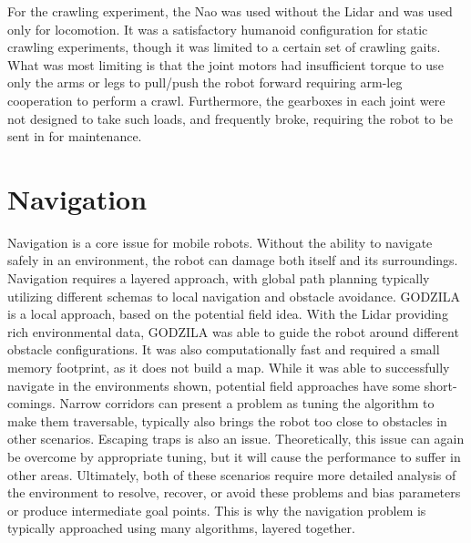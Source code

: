 For the crawling experiment, the Nao was used without the Lidar and was used 
only for locomotion. It was a satisfactory humanoid configuration for static
crawling experiments, though it was limited to a certain set of crawling
gaits. What was most limiting is that the joint motors had insufficient
torque to use only the arms or legs to pull/push the robot forward requiring
arm-leg cooperation to perform a crawl. Furthermore, the gearboxes in each
joint were not designed to take such loads, and frequently broke, requiring
the robot to be sent in for maintenance.

\section{Navigation}
Navigation is a core issue for mobile robots. Without the ability to navigate
safely in an environment, the robot can damage both itself and its surroundings.
Navigation requires a layered approach, with global path planning typically
utilizing different schemas to local navigation and obstacle avoidance.
GODZILA is a local approach, based on the potential field idea.
With the Lidar providing rich environmental data, GODZILA was able to guide
the robot around different obstacle configurations. It was also computationally
fast and required a small memory footprint, as it does not build a map.
While it was able to successfully navigate in the environments shown, potential
field approaches have some short-comings. Narrow corridors can present a problem
as tuning the algorithm to make them traversable, typically also brings the
robot too close to obstacles in other scenarios. Escaping traps is also an
issue. Theoretically, this issue can again be overcome by appropriate tuning,
but it will cause the performance to suffer in other areas.
Ultimately, both of these scenarios require more detailed analysis of the
environment to resolve, recover, or avoid these problems and bias parameters
or produce intermediate goal points. This is why the navigation problem is
typically approached using many algorithms, layered together.

